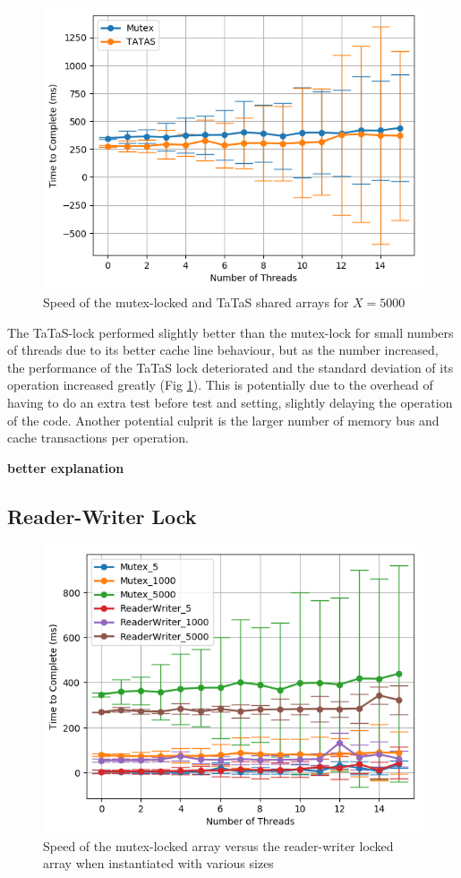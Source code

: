 \documentclass[11pt]{article}
\newcommand{\todo}[1]{\textbf{#1}}
\begin{document}
\begin{figure}\label{fig:step4_1}
\centering
\includegraphics[scale=0.65]{step4_1.png}
\caption{Speed of the mutex-locked and TaTaS shared arrays for $X=5000$}
\end{figure}


The TaTaS-lock performed slightly better than the mutex-lock for small numbers of threads due to its better cache line behaviour, but as the number increased, the performance of the TaTaS lock deteriorated and the standard deviation of its operation increased greatly (Fig \ref{fig:step4_1}).  This is potentially due to the overhead of having to do an extra test before test and setting, slightly delaying the operation of the code. Another potential culprit is the larger number of memory bus and cache transactions per operation.

\todo{better explanation}

\subsection{Reader-Writer Lock}
\begin{figure}\label{fig:step5_1}
\centering
\includegraphics[scale=0.65]{step5_1.png}
\caption{Speed of the mutex-locked array versus the reader-writer locked array when instantiated with various sizes}
\end{figure}
\end{document}
